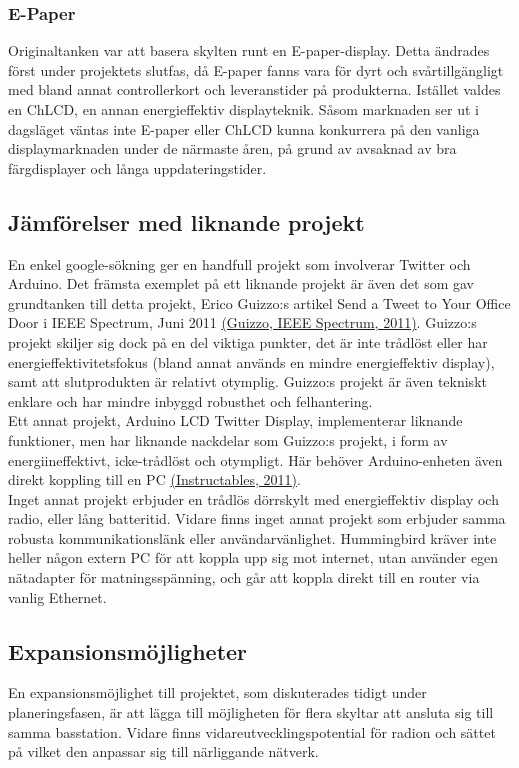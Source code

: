 \documentclass[a4paper,11pt]{article}
\begin{document}
\subsubsection{E-Paper}
Originaltanken var att basera skylten runt en E-paper-display. Detta ändrades först under projektets slutfas, då E-paper fanns vara för dyrt och svårtillgängligt med bland annat controllerkort och leveranstider på produkterna. Istället valdes en ChLCD, en annan energieffektiv displayteknik. Såsom marknaden ser ut i dagsläget väntas inte E-paper eller ChLCD kunna konkurrera på den vanliga displaymarknaden under de närmaste åren, på grund av avsaknad av bra färgdisplayer och långa uppdateringstider.

\subsection{Jämförelser med liknande projekt}
En enkel google-sökning ger en handfull projekt som involverar Twitter och Arduino. Det främsta exemplet på ett liknande projekt är även det som gav grundtanken till detta projekt, Erico Guizzo:s artikel Send a Tweet to Your Office Door i IEEE Spectrum, Juni 2011 \hyperref[spectrum]{(Guizzo, IEEE Spectrum, 2011)}. Guizzo:s projekt skiljer sig dock på en del viktiga punkter, det är inte trådlöst eller har energieffektivitetsfokus (bland annat används en mindre energieffektiv display), samt att slutprodukten är relativt otymplig. Guizzo:s projekt är även tekniskt enklare och har mindre inbyggd robusthet och felhantering. \\

Ett annat projekt, Arduino LCD Twitter Display, implementerar liknande funktioner, men har liknande nackdelar som Guizzo:s projekt, i form av energiineffektivt, icke-trådlöst och otympligt. Här behöver Arduino-enheten även direkt koppling till en PC \hyperref[instructables]{(Instructables, 2011)}. \\

Inget annat projekt erbjuder en trådlös dörrskylt med energieffektiv display och radio, eller lång batteritid. Vidare finns inget annat projekt som erbjuder samma robusta kommunikationslänk eller användarvänlighet. Hummingbird kräver inte heller någon extern PC för att koppla upp sig mot internet, utan använder egen nätadapter för matningsspänning, och går att koppla direkt till en router via vanlig Ethernet. \\

\subsection{Expansionsmöjligheter}
En expansionsmöjlighet till projektet, som diskuterades tidigt under planeringsfasen, är att lägga till möjligheten för flera skyltar att ansluta sig till samma basstation. Vidare finns vidareutvecklingspotential för radion och sättet på vilket den anpassar sig till närliggande nätverk. \\
\end{document}
